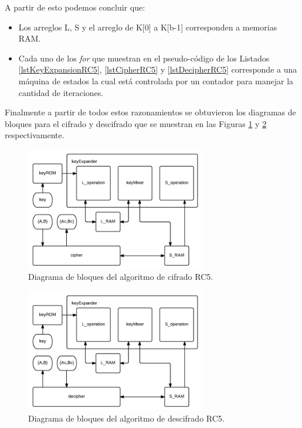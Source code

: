 A partir de esto podemos concluir que:
\begin{itemize}
\item Los arreglos L, S y el arreglo de K[0] a K[b-1] corresponden a memorias RAM.
\item Cada uno de los \textit{for} que muestran en el pseudo-código de los Listados \ref{lstKeyExpansionRC5}, \ref{lstCipherRC5} y \ref{lstDecipherRC5} corresponde a una máquina de estados la cual está controlada por un contador para manejar la cantidad de iteraciones.
\end{itemize}
Finalmente a partir de todos estos razonamientos se obtuvieron los diagramas de bloques para el cifrado y descifrado que se muestran en las Figuras \ref{figCipherBlockDiagram} y \ref{figDecipherBlockDiagram} respectivamente.

\begin{figure}
	\centering
	\includegraphics[width=0.7\textwidth]{./images/figCipherBlockDiagram}
	\caption{Diagrama de bloques del algoritmo de cifrado RC5.}
	\label{figCipherBlockDiagram}
\end{figure}
\begin{figure}
	\centering
	\includegraphics[width=0.7\textwidth]{./images/figDecipherBlockDiagram}
	\caption{Diagrama de bloques del algoritmo de descifrado RC5.}
	\label{figDecipherBlockDiagram}
\end{figure}


